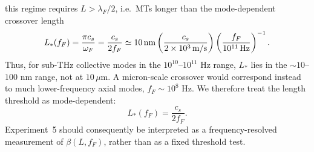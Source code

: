 \documentclass[twocolumn,10pt]{article}
\begin{document}
this regime requires $L>\lambda_F/2$, i.e.\ MTs longer than the
mode-dependent crossover length\begin{equation}
L_*(f_F)=\frac{\pi c_s}{\omega_F}
=\frac{c_s}{2 f_F}
\simeq
10\,{\rm nm}
\left(\frac{c_s}{2\times10^3\,{\rm m/s}}\right)
\left(\frac{f_F}{10^{11}\,{\rm Hz}}\right)^{-1}.
\end{equation}
Thus, for sub-THz collective modes in the $10^{10}$--$10^{11}$ Hz range,
$L_*$ lies in the $\sim 10$--$100$ nm range, not at $10\,\mu$m. A
micron-scale crossover would correspond instead to much lower-frequency
axial modes, $f_F\sim10^8$ Hz. We therefore treat the length threshold as
mode-dependent:
\begin{equation}
L_*(f_F)=\frac{c_s}{2f_F}.
\end{equation}
Experiment~5 should consequently be interpreted as a frequency-resolved
measurement of $\beta(L,f_F)$, rather than as a fixed threshold
test.
\end{document}
